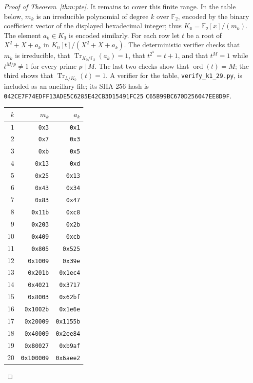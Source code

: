 \documentclass[11pt]{article}
\begin{document}
\begin{proof}[Proof of Theorem~\ref{thm:pte}]
It remains to cover this finite range. In the table below, $m_k$ is an
irreducible polynomial of degree $k$ over $\mathbb F_2$, encoded by the
binary coefficient vector of the displayed hexadecimal integer; thus
$K_0=\mathbb F_2[x]/(m_k)$. The element $a_k\in K_0$ is encoded similarly.
For each row let $t$ be a root of $X^2+X+a_k$ in
$K_0[t]/(X^2+X+a_k)$. The deterministic verifier checks that $m_k$ is
irreducible, that $\operatorname{Tr}_{K_0/\mathbb F_2}(a_k)=1$, that
$t^{2^k}=t+1$, and that $t^M=1$ while $t^{M/p}\ne1$ for every prime
$p\mid M$. The last two checks show that $\operatorname{ord}(t)=M$; the
third shows that $\operatorname{Tr}_{L/K_0}(t)=1$. A verifier for the table, \texttt{verify\_k1\_29.py},
is included as an ancillary file; its SHA-256 hash is
\texttt{042CE7F74EDFF13ADE5C6285E42CB3D15491FC25}\allowbreak
\texttt{C65B99BC670D256047EE8D9F}.
\begin{center}
\small
\begin{tabular}{rrr}
$k$ & $m_k$ & $a_k$\\
\hline
1 & \texttt{0x3} & \texttt{0x1}\\
2 & \texttt{0x7} & \texttt{0x3}\\
3 & \texttt{0xb} & \texttt{0x5}\\
4 & \texttt{0x13} & \texttt{0xd}\\
5 & \texttt{0x25} & \texttt{0x13}\\
6 & \texttt{0x43} & \texttt{0x34}\\
7 & \texttt{0x83} & \texttt{0x47}\\
8 & \texttt{0x11b} & \texttt{0xc8}\\
9 & \texttt{0x203} & \texttt{0x2b}\\
10 & \texttt{0x409} & \texttt{0xcb}\\
11 & \texttt{0x805} & \texttt{0x525}\\
12 & \texttt{0x1009} & \texttt{0x39e}\\
13 & \texttt{0x201b} & \texttt{0x1ec4}\\
14 & \texttt{0x4021} & \texttt{0x3717}\\
15 & \texttt{0x8003} & \texttt{0x62bf}\\
16 & \texttt{0x1002b} & \texttt{0x1e6e}\\
17 & \texttt{0x20009} & \texttt{0x1155b}\\
18 & \texttt{0x40009} & \texttt{0x2ee84}\\
19 & \texttt{0x80027} & \texttt{0xb9af}\\
20 & \texttt{0x100009} & \texttt{0x6aee2}\\

\end{tabular}
\end{center}
\end{proof}
\end{document}
